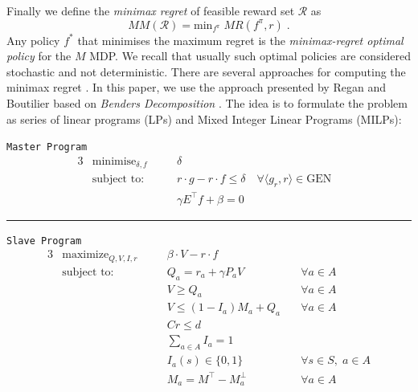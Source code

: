 \documentclass[sigconf]{aamas}  %
\begin{document}
Finally we define the \textit{minimax regret} of feasible reward set $\mathcal{R}$ as
$$MM(\mathcal{R}) = \text{min}_{f^{\pi}}\; MR(f^{\pi}, r)\;.$$
Any policy $f^*$  that minimises the maximum regret is the \textit{minimax-regret optimal policy} for the $M$ MDP. 
We recall that usually such optimal policies are considered stochastic and not deterministic.
There are several approaches for computing the minimax regret \cite{alizadeh2015,benavent2018,Regan2009,daSilva2011,Xu2009}. 
In this paper, we use the approach presented by Regan and Boutilier \citep{Regan2009} based on \textit{Benders Decomposition} \cite{Benders1962}.
 The idea is to formulate the problem as series of linear programs (LPs) and Mixed Integer Linear Programs (MILPs):


\begin{center}\label{minimax}
\texttt{Master Program}
\begin{alignat}{3}
&\text{minimise}_{\delta, f} && \delta & \\
&\text{subject to:}&\quad& r\cdot g - r \cdot f \leq \delta \quad \forall \langle g_r, r \rangle \in \text{GEN}\label{delta_cut}\\
&& \quad& \gamma E^{\top} f + \beta = 0 
\end{alignat}
\begin{center}
\noindent\rule{8cm}{0.4pt}
\end{center} 
\texttt{Slave Program}
\begin{alignat}{3}
&\text{maximize}_{Q, V, I, r} && \beta \cdot V - r \cdot f \\
&\text{subject to:} &\quad& Q_a = r_a + \gamma P_aV &\quad \forall a \in A\\
&& \quad& V \geq Q_a  &\quad \forall a \in A\\
&& \quad& V \leq (1-I_a)M_a + Q_a  &\quad \forall a \in A\\
&& \quad& Cr \leq d \\
&& \quad& \sum_{a \in A} I_a = 1  \label{eq:sum_I}\\
&& \quad& I_a(s) \in \{0, 1 \} &\quad \forall s \in S, \; a \in A \label{eq:bin_I}\\
&& \quad& M_a = M^{\top} - M_a^{\perp} &\quad \forall a \in A
\end{alignat}
\end{center}
\end{document}
